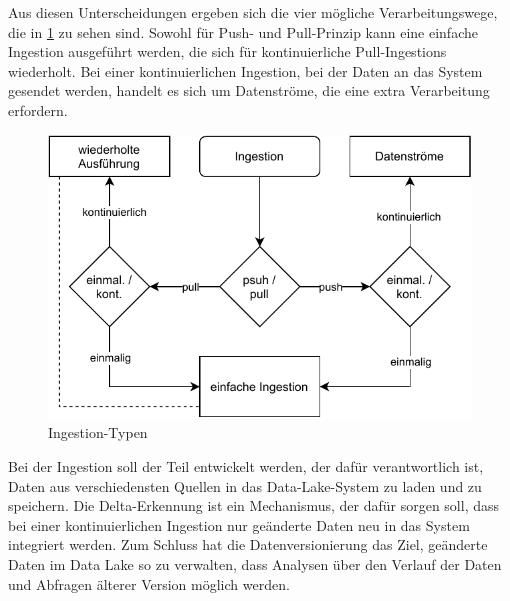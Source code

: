 Aus diesen Unterscheidungen ergeben sich die vier mögliche Verarbeitungswege, die in \ref{fig:ingestion_types} zu sehen sind.
Sowohl für Push- und Pull-Prinzip kann eine einfache Ingestion ausgeführt werden, die sich für kontinuierliche Pull-Ingestions wiederholt.
Bei einer kontinuierlichen Ingestion, bei der Daten an das System gesendet werden, handelt es sich um Datenströme, die eine extra Verarbeitung erfordern.

\begin{figure}
  \centering
  \includegraphics{Grafiken/ingestion-types.pdf}
  \caption{Ingestion-Typen}
  \label{fig:ingestion_types}
\end{figure}





Bei der Ingestion soll der Teil entwickelt werden, der dafür verantwortlich ist, Daten aus verschiedensten Quellen in das Data-Lake-System zu laden und zu speichern.
Die Delta-Erkennung ist ein Mechanismus, der dafür sorgen soll, dass bei einer kontinuierlichen Ingestion nur geänderte Daten neu in das System integriert werden.
Zum Schluss hat die Datenversionierung das Ziel, geänderte Daten im Data Lake so zu verwalten, dass Analysen über den Verlauf der Daten und Abfragen älterer Version möglich werden.




